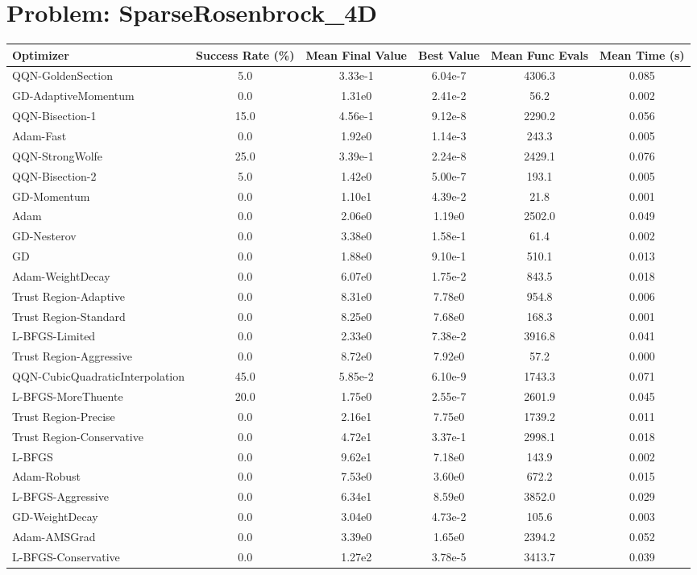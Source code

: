 \documentclass{article}
\begin{document}
\section{Problem: SparseRosenbrock\_4D}
\begin{longtable}{p{3cm}*{5}{c}}
\toprule
\textbf{Optimizer} & \textbf{Success Rate (\%)} & \textbf{Mean Final Value} & \textbf{Best Value} & \textbf{Mean Func Evals} & \textbf{Mean Time (s)} \\
\midrule
QQN-GoldenSection & 5.0 & 3.33e-1 & 6.04e-7 & 4306.3 & 0.085 \\
GD-AdaptiveMomentum & 0.0 & 1.31e0 & 2.41e-2 & 56.2 & 0.002 \\
QQN-Bisection-1 & 15.0 & 4.56e-1 & 9.12e-8 & 2290.2 & 0.056 \\
Adam-Fast & 0.0 & 1.92e0 & 1.14e-3 & 243.3 & 0.005 \\
QQN-StrongWolfe & 25.0 & 3.39e-1 & 2.24e-8 & 2429.1 & 0.076 \\
QQN-Bisection-2 & 5.0 & 1.42e0 & 5.00e-7 & 193.1 & 0.005 \\
GD-Momentum & 0.0 & 1.10e1 & 4.39e-2 & 21.8 & 0.001 \\
Adam & 0.0 & 2.06e0 & 1.19e0 & 2502.0 & 0.049 \\
GD-Nesterov & 0.0 & 3.38e0 & 1.58e-1 & 61.4 & 0.002 \\
GD & 0.0 & 1.88e0 & 9.10e-1 & 510.1 & 0.013 \\
Adam-WeightDecay & 0.0 & 6.07e0 & 1.75e-2 & 843.5 & 0.018 \\
Trust Region-Adaptive & 0.0 & 8.31e0 & 7.78e0 & 954.8 & 0.006 \\
Trust Region-Standard & 0.0 & 8.25e0 & 7.68e0 & 168.3 & 0.001 \\
L-BFGS-Limited & 0.0 & 2.33e0 & 7.38e-2 & 3916.8 & 0.041 \\
Trust Region-Aggressive & 0.0 & 8.72e0 & 7.92e0 & 57.2 & 0.000 \\
QQN-CubicQuadraticInterpolation & 45.0 & 5.85e-2 & 6.10e-9 & 1743.3 & 0.071 \\
L-BFGS-MoreThuente & 20.0 & 1.75e0 & 2.55e-7 & 2601.9 & 0.045 \\
Trust Region-Precise & 0.0 & 2.16e1 & 7.75e0 & 1739.2 & 0.011 \\
Trust Region-Conservative & 0.0 & 4.72e1 & 3.37e-1 & 2998.1 & 0.018 \\
L-BFGS & 0.0 & 9.62e1 & 7.18e0 & 143.9 & 0.002 \\
Adam-Robust & 0.0 & 7.53e0 & 3.60e0 & 672.2 & 0.015 \\
L-BFGS-Aggressive & 0.0 & 6.34e1 & 8.59e0 & 3852.0 & 0.029 \\
GD-WeightDecay & 0.0 & 3.04e0 & 4.73e-2 & 105.6 & 0.003 \\
Adam-AMSGrad & 0.0 & 3.39e0 & 1.65e0 & 2394.2 & 0.052 \\
L-BFGS-Conservative & 0.0 & 1.27e2 & 3.78e-5 & 3413.7 & 0.039 \\
\bottomrule
\end{longtable}
\end{document}
